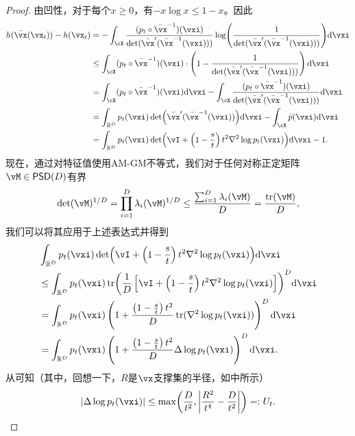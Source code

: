 \documentclass[../../book-main_zh.tex]{subfiles}
\begin{document}
\begin{proof}
    由凹性，对于每个\(x \geq 0\)，有\(-x\log x \leq 1 - x\)。因此
    \begin{align}
        h(\bar{\vx}(\vx_{t})) - h(\vx_{t})
        &= - \int_{\cX}\frac{(p_{t} \circ \bar{\vx}^{-1})(\vxi)}{\det(\bar{\vx}^{\prime}(\bar{\vx}^{-1}(\vxi)))}\log\rp{\frac{1}{\det(\bar{\vx}^{\prime}(\bar{\vx}^{-1}(\vxi)))}}\odif{\vxi} \\ 
        &\leq  \int_{\cX}(p_{t} \circ \bar{\vx}^{-1})(\vxi)\cdot \bp{1 - \frac{1}{\det(\bar{\vx}^{\prime}(\bar{\vx}^{-1}(\vxi)))}}\odif{\vxi} \\ 
        &= \int_{\cX}(p_{t} \circ \bar{\vx}^{-1})(\vxi)\odif{\vxi} - \int_{\cX}\frac{(p_{t} \circ \bar{\vx}^{-1})(\vxi)}{\det(\bar{\vx}^{\prime}(\bar{\vx}^{-1}(\vxi)))}\odif{\vxi} \\
        &= \int_{\R^{D}}p_{t}(\vxi)\det\rp{\bar{\vx}^{\prime}(\bar{\vx}^{-1}(\vxi))}\odif{\vxi} - \int_{\cX}\bar{p}(\vxi)\odif{\vxi} \\
        &= \int_{\R^{D}}p_{t}(\vxi)\det\rp{\vI + \bp{1 - \frac{s}{t}}t^{2}\nabla^{2}\log p_{t}(\vxi)}\odif{\vxi} - 1.
    \end{align}
    现在，通过对特征值使用AM-GM不等式，我们对于任何对称正定矩阵\(\vM \in \PSD(D)\)有界
    \begin{equation}
        \det(\vM)^{1/D} = \prod_{i = 1}^{D}\lambda_{i}(\vM)^{1/D} \leq \frac{\sum_{i = 1}^{D}\lambda_{i}(\vM)}{D} = \frac{\tr(\vM)}{D},
    \end{equation}
    我们可以将其应用于上述表达式并得到
    \begin{align}
        &\int_{\R^{D}}p_{t}(\vxi)\det\rp{\vI + \bp{1 - \frac{s}{t}}t^{2}\nabla^{2}\log p_{t}(\vxi)}\odif{\vxi} \\
        &\leq \int_{\R^{D}} p_{t}(\vxi) \tr\rp{\frac{1}{D}\bs{\vI + \bp{1 - \frac{s}{t}}t^{2}\nabla^{2}\log p_{t}(\vxi)}}^{D}\odif{\vxi} \\
        &= \int_{\R^{D}} p_{t}(\vxi)\bp{1 + \frac{\bp{1 - \frac{s}{t}}t^{2}}{D}\tr(\nabla^{2}\log p_{t}(\vxi))}^{D}\odif{\vxi} \\
        &= \int_{\R^{D}} p_{t}(\vxi)\bp{1 + \frac{\bp{1 - \frac{s}{t}}t^{2}}{D}\Delta \log p_{t}(\vxi)}^{D}\odif{\vxi}.
    \end{align}
    从可知（其中，回想一下，\(R\)是\(\vx\)支撑集的半径，如中所示）
    \begin{equation}
        \abs{\Delta \log p_{t}(\vxi)} \leq \max\rp{\frac{D}{t^{2}}, \abs*{\frac{R^{2}}{t^{4}} - \frac{D}{t^{2}}}} =: U_{t}.

\end{equation}
\end{proof}
\end{document}
